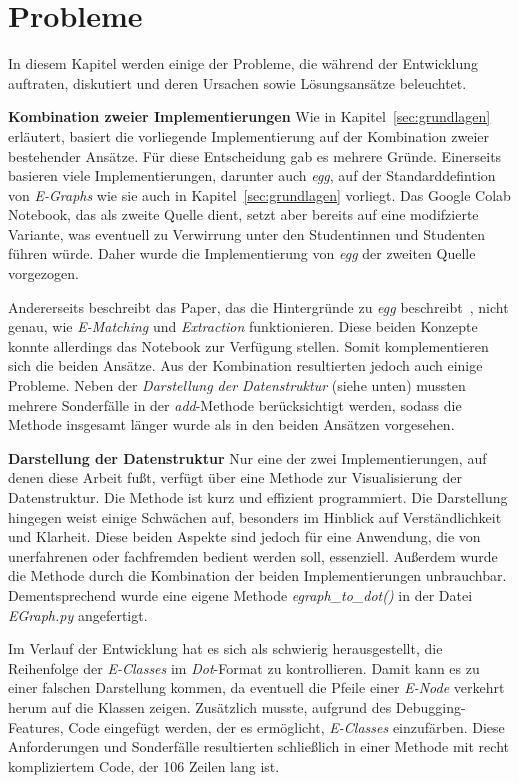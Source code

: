 \section{Probleme}\label{sec:probleme}

In diesem Kapitel werden einige der Probleme, die während der Entwicklung auftraten, diskutiert und deren Ursachen sowie Lösungsansätze beleuchtet.

\noindent\textbf{Kombination zweier Implementierungen} Wie in Kapitel~\ref{sec:grundlagen} erläutert, basiert die vorliegende Implementierung
auf der Kombination zweier bestehender Ansätze. Für diese Entscheidung gab es mehrere Gründe.
Einerseits basieren viele Implementierungen, darunter auch \textit{egg}, auf der Standarddefintion von \textit{E-Graphs} wie sie auch in Kapitel~\ref{sec:grundlagen} vorliegt.
Das Google Colab Notebook, das als zweite Quelle dient, setzt aber bereits auf eine modifzierte Variante, was eventuell zu Verwirrung unter den Studentinnen und Studenten
führen würde. Daher wurde die Implementierung von \textit{egg} der zweiten Quelle vorgezogen.

Andererseits beschreibt das Paper, das die Hintergründe zu \textit{egg} beschreibt~\cite{2021-egg}, nicht genau, wie \textit{E-Matching} und \textit{Extraction} funktionieren.  
Diese beiden Konzepte konnte allerdings das Notebook zur Verfügung stellen. Somit komplementieren sich die beiden Ansätze.
Aus der Kombination resultierten jedoch auch einige Probleme. Neben der \textit{Darstellung der Datenstruktur} (siehe unten) mussten mehrere Sonderfälle in der \textit{add}-Methode
berücksichtigt werden, sodass die Methode insgesamt länger wurde als in den beiden Ansätzen vorgesehen.

\noindent\textbf{Darstellung der Datenstruktur} Nur eine der zwei Implementierungen, auf denen diese Arbeit fußt, verfügt über eine Methode zur Visualisierung der Datenstruktur.
Die Methode ist kurz und effizient programmiert. Die Darstellung hingegen weist einige Schwächen auf, besonders im Hinblick auf Verständlichkeit und Klarheit.
Diese beiden Aspekte sind jedoch für eine Anwendung, die von unerfahrenen oder fachfremden bedient werden soll, essenziell.
Außerdem wurde die Methode durch die Kombination der beiden Implementierungen unbrauchbar.
Dementsprechend wurde eine eigene Methode \textit{egraph\_to\_dot()} in der Datei \textit{EGraph.py} angefertigt.

Im Verlauf der Entwicklung hat es sich als schwierig herausgestellt, die Reihenfolge der \textit{E-Classes} im \textit{Dot}-Format zu kontrollieren.
Damit kann es zu einer falschen Darstellung kommen, da eventuell die Pfeile einer \textit{E-Node} verkehrt herum auf die Klassen zeigen.
Zusätzlich musste, aufgrund des Debugging-Features, Code eingefügt werden, der es ermöglicht, \textit{E-Classes} einzufärben.
Diese Anforderungen und Sonderfälle resultierten schließlich in einer Methode mit recht kompliziertem Code, der 106 Zeilen lang ist.

